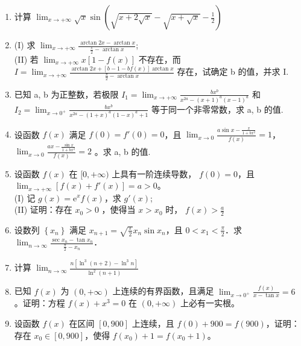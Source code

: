 \documentclass[12pt, a4paper]{ctexart}
\begin{document}
\begin{enumerate}[start=31]
    \item 计算 $ \lim_{x\to+\infty}\sqrt{x}\sin\left(\sqrt{x+2\sqrt{x}}-\sqrt{x+\sqrt{x}}-\frac{1}{2}\right) $

    \item (I) 求 $ \lim_{x\to+\infty}\frac{\arctan2x-\arctan x}{\frac{\pi}{2}-\arctan x} $;\\
    (II) 若 $ \lim_{x\to+\infty}x\left[1-f(x)\right] $ 不存在，而 $ I=\lim_{x\to+\infty}\frac{\arctan2x+\left[b-1-bf(x)\right]\arctan x}{\frac{\pi}{2}-\arctan x} $ 存在，试确定 b 的值，并求 I.

    \item 已知 a, b 为正整数，若极限 $ I_{1} = \lim_{x \to +\infty} \frac{bx^{b}}{x^{2a} - (x + 1)^{a}(x - 1)^{a}} $ 和 $ I_{2} = \lim_{x \to 0^{+}} \frac{bx^{b}}{x^{2a} - (1 + x)^{a}(1 - x)^{a} + 1} $ 等于同一个非零常数，求 a, b 的值.

    \item 设函数 $ f(x) $ 满足 $ f(0) = f'(0) = 0 $，且 $ \lim_{x \to 0} \frac{a \sin x - \frac{x}{1 + bx^2}}{f(x)} = 1 $， $ \lim_{x \to 0} \frac{ax - \frac{\sin x}{1 + bx^2}}{f(x)} = 2 $ 。求 a, b 的值.

    \item 设函数 $ f(x) $ 在 $ [0, +\infty) $ 上具有一阶连续导数， $ f(0) = 0 $，且 $ \lim_{x \to +\infty} \left[ f(x) + f'(x) \right] = a > 0 $。\\
    (I) 记 $ g(x) = \mathrm{e}^{x} f(x) $，求 $ g'(x) $;\\
    (II) 证明：存在 $ x_{0}>0 $ ，使得当 $ x>x_{0} $ 时， $ f(x)>\frac{a}{2} $

    \item 设数列 $ \left\{x_{n}\right\} $ 满足 $ x_{n+1}=\sqrt{\frac{\pi}{2}}x_{n}\sin x_{n} $，且 $ 0<x_{1}<\frac{\pi}{2} $．求 $ \lim_{n\to\infty}\frac{\sec x_{n}-\tan x_{n}}{\frac{\pi}{2}-x_{n}} $．

    \item 计算 $ \lim_{n\to\infty}\frac{n\left[\ln^{3}\left(n+2\right)-\ln^{3}n\right]}{\ln^{2}\left(n+1\right)} $

    \item 已知 $ f(x) $ 为 $ (0,+\infty) $ 上连续的有界函数，且满足 $ \lim_{x\to0^{+}}\frac{f(x)}{x-\tan x}=6 $ 。证明：方程 $ f(x)+x^{3}=0 $ 在 $ (0,+\infty) $ 上必有一实根。

    \item 设函数 $ f(x) $ 在区间 $ [0,900] $ 上连续，且 $ f(0) + 900 = f(900) $，证明：存在 $ x_0 \in [0,900] $，使得 $ f(x_0) + 1 = f(x_0 + 1) $。


\end{enumerate}
\end{document}
